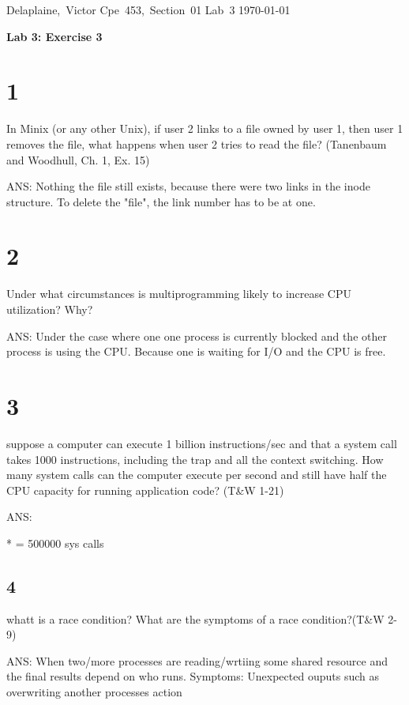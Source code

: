 \documentclass[11pt]{article}
\begin{document}
\hfill\vbox{\hbox{Delaplaine, Victor}
		\hbox{Cpe 453, Section 01}	
		\hbox{Lab 3}	
		\hbox{\today}}\par

\bigskip
\centerline{\Large\bf Lab 3: Exercise 3}\par
\bigskip 



\section{1}
In Minix (or any other Unix), if user 2 links to a file owned by user 1, then user 1 removes
the file, what happens when user 2 tries to read the file? (Tanenbaum and Woodhull, Ch. 1,
Ex. 15)
 
ANS: Nothing the file still exists, because there were two links in the inode structure. 
	To delete the "file", the link number has to be at one.


\section{2}
Under what circumstances is multiprogramming likely to increase CPU utilization? Why?

ANS: Under the case where one one process is currently blocked and the other process is using the CPU.
	Because one is waiting for I/O and the CPU is free.


\section{3}
suppose a computer can execute 1 billion instructions/sec and that a system call takes 1000
instructions, including the trap and all the context switching. How many system calls can
the computer execute per second and still have half the CPU capacity for running application
code? (T&W 1-21)

ANS: 

* = 500000 sys calls



\subsection{4}

whatt is a race condition? What are the symptoms of a race condition?(T&W 2-9)

ANS: When two/more processes are reading/wrtiing some shared resource and the final results depend on who runs.
	Symptoms: Unexpected ouputs such as overwriting another processes action
\end{document}
